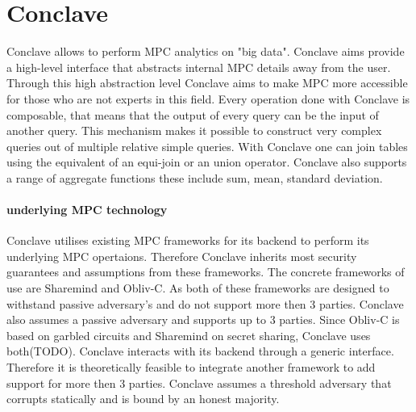 \section{Conclave}
 Conclave \cite{10.1145/3302424.3303982} allows to perform MPC analytics on "big data". Conclave aims provide a high-level interface that abstracts internal MPC details away from the user. Through this high abstraction level Conclave aims to make MPC more accessible for those who are not experts in this field.  Every operation done with Conclave is composable, that means that the output of every query can be the input of another query. This mechanism makes it possible to construct very complex queries out of multiple relative simple queries.  With Conclave one can join tables using the equivalent of an equi-join or an union operator. Conclave also supports a range of aggregate functions these include sum, mean, standard deviation. 

\paragraph{underlying MPC technology}
Conclave utilises existing MPC frameworks for its backend to perform its underlying MPC opertaions. Therefore Conclave inherits most security guarantees and assumptions from these frameworks. The concrete frameworks of use are Sharemind and Obliv-C. As both of these frameworks are designed to withstand passive adversary's and do not support more then 3 parties. Conclave also assumes a passive adversary and supports up to 3 parties.
Since Obliv-C is based on garbled circuits and Sharemind on secret sharing, Conclave uses both(TODO). Conclave interacts with its backend through a generic interface. Therefore it is theoretically feasible to integrate another framework to add support for more then 3 parties. Conclave assumes a threshold adversary that corrupts statically and is bound by an honest majority.

